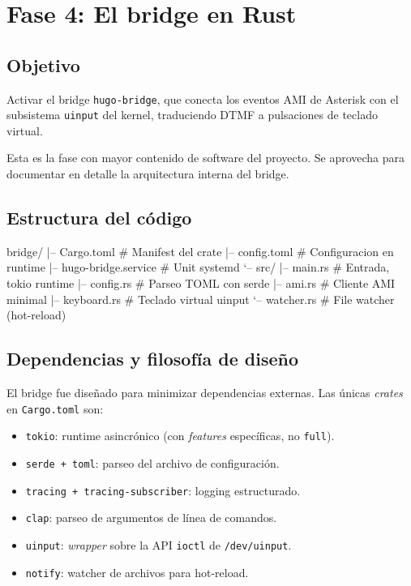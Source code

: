 \chapter{Fase 4: El bridge en Rust}

\section{Objetivo}

Activar el bridge \texttt{hugo-bridge}, que conecta los eventos AMI de Asterisk con el subsistema \texttt{uinput} del kernel, traduciendo DTMF a pulsaciones de teclado virtual.

Esta es la fase con mayor contenido de software del proyecto. Se aprovecha para documentar en detalle la arquitectura interna del bridge.

\section{Estructura del código}

\begin{plaincode}
bridge/
|-- Cargo.toml                 # Manifest del crate
|-- config.toml                # Configuracion en runtime
|-- hugo-bridge.service        # Unit systemd
`-- src/
    |-- main.rs                # Entrada, tokio runtime
    |-- config.rs              # Parseo TOML con serde
    |-- ami.rs                 # Cliente AMI minimal
    |-- keyboard.rs            # Teclado virtual uinput
    `-- watcher.rs             # File watcher (hot-reload)
\end{plaincode}

\section{Dependencias y filosofía de diseño}

El bridge fue diseñado para minimizar dependencias externas. Las únicas \emph{crates} en \texttt{Cargo.toml} son:

\begin{itemize}
  \item \texttt{tokio}: runtime asincrónico (con \emph{features} específicas, no \texttt{full}).
  \item \texttt{serde + toml}: parseo del archivo de configuración.
  \item \texttt{tracing + tracing-subscriber}: logging estructurado.
  \item \texttt{clap}: parseo de argumentos de línea de comandos.
  \item \texttt{uinput}: \emph{wrapper} sobre la API \texttt{ioctl} de \texttt{/dev/uinput}.
  \item \texttt{notify}: watcher de archivos para hot-reload.
\end{itemize}


